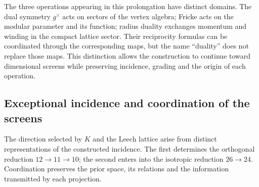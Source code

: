 The three operations appearing in this prolongation have
distinct domains. The dual symmetry \(g^\vee\) acts on sectors
of the vertex algebra; Fricke acts on the modular parameter and
its function; radius duality exchanges momentum and winding
in the compact lattice sector. Their reciprocity formulas can
be coordinated through the corresponding maps, but the name
“duality” does not replace those maps. This distinction allows the
construction to continue toward dimensional screens while preserving
incidence, grading and the origin of each operation.





\subsection{Exceptional incidence and coordination of the screens}
\label{x_reciprocidad:exc:pantallas-dualidad}

The direction selected by \(K\) and the Leech lattice arise
from distinct representations of the constructed incidence. The first
determines the orthogonal reduction \(12\to11\to10\); the second
enters into the isotropic reduction \(26\to24\). Coordination
preserves the prior space, its relations and the information transmitted
by each projection.

